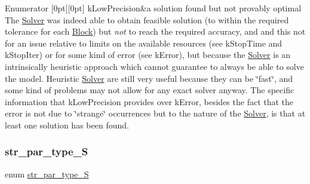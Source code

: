 \begin{DoxyEnumFields}{Enumerator}
[0pt][0pt]{}\mbox{\label{class_s_m_spp__di__unipi__it_1_1_solver_a2e0367580e249e8e6018c919bee5481da40a32159eb57f4dd1afc6de9351d3296}} 
k\+Low\+Precision&a solution found but not provably optimal The \mbox{\hyperlink{class_s_m_spp__di__unipi__it_1_1_solver}{Solver}} was indeed able to obtain feasible solution (to within the required tolerance for each \mbox{\hyperlink{class_s_m_spp__di__unipi__it_1_1_block}{Block}}) but {\itshape not} to reach the required accuracy, and and this not for an issue relative to limits on the available resources (see k\+Stop\+Time and k\+Stop\+Iter) or for some kind of error (see k\+Error), but because the \mbox{\hyperlink{class_s_m_spp__di__unipi__it_1_1_solver}{Solver}} is an intrinsically heuristic approach which cannot guarantee to always be able to solve the model. Heuristic \mbox{\hyperlink{class_s_m_spp__di__unipi__it_1_1_solver}{Solver}} are still very useful because they can be \char`\"{}fast\char`\"{}, and some kind of problems may not allow for any exact solver anyway. The specific information that k\+Low\+Precision provides over k\+Error, besides the fact that the error is not due to \char`\"{}strange\char`\"{} occurrences but to the nature of the \mbox{\hyperlink{class_s_m_spp__di__unipi__it_1_1_solver}{Solver}}, is that at least one solution has been found. \\
\hline

\end{DoxyEnumFields}
\mbox{\label{class_s_m_spp__di__unipi__it_1_1_solver_a350eaed52c8a495f2505e5556affaa04}} 
\subsubsection{\texorpdfstring{str\+\_\+par\+\_\+type\+\_\+S}{str\_par\_type\_S}}
{\footnotesize\ttfamily enum \mbox{\hyperlink{class_s_m_spp__di__unipi__it_1_1_solver_a350eaed52c8a495f2505e5556affaa04}{str\+\_\+par\+\_\+type\+\_\+S}}}



